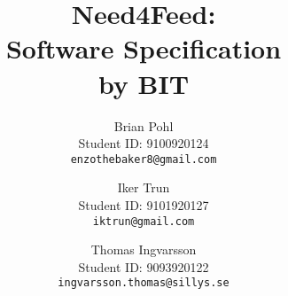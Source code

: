 \documentclass[]{article}
\begin{document}
\title{Need4Feed: \\
Software Specification\\
by BIT}


\author{Brian Pohl\\
Student ID: 9100920124\\
\texttt{enzothebaker8@gmail.com}
\and
Iker Trun\\
Student ID: 9101920127\\
\texttt{iktrun@gmail.com}
\and
Thomas Ingvarsson\\
Student ID: 9093920122\\
\texttt{ingvarsson.thomas@sillys.se}
}


\maketitle





\setcounter{tocdepth}{2}
\tableofcontents












\end{document}
